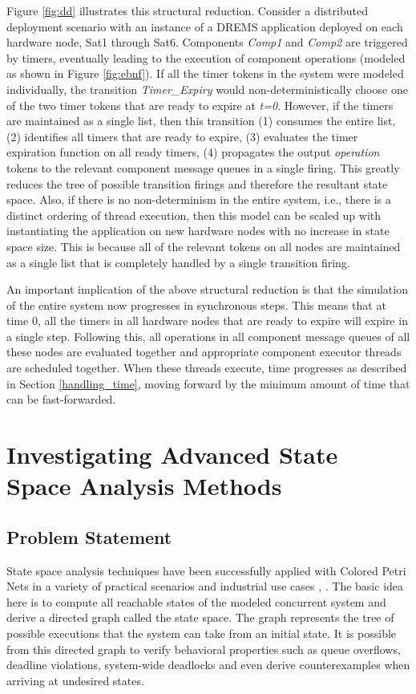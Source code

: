 Figure \ref{fig:dd} illustrates this structural reduction. Consider a distributed deployment scenario with an instance of a DREMS application deployed on each hardware node, Sat1 through Sat6. Components \emph{Comp1} and \emph{Comp2} are triggered by timers, eventually leading to the execution of component operations (modeled as shown in Figure \ref{fig:ebnf}). If all the timer tokens in the system were modeled individually, the transition \emph{Timer\_Expiry} would non-deterministically choose one of the two timer tokens that are ready to expire at \emph{t=0}. However, if the timers are maintained as a single list, then this transition (1) consumes the entire list, (2) identifies all timers that are ready to expire, (3) evaluates the timer expiration function on all ready timers, (4) propagates the output \emph{operation} tokens to the relevant component message queues in a single firing. This greatly reduces the tree of possible transition firings and therefore the resultant state space. Also, if there is no non-determinism in the entire system, i.e., there is a distinct ordering of thread execution, then this model can be scaled up with instantiating the application on new hardware nodes with no increase in state space size. This is because all of the relevant tokens on all nodes are maintained as a single list that is completely handled by a single transition firing. 

An important implication of the above structural reduction is that the simulation of the entire system now progresses in synchronous steps. This means that at time 0, all the timers in all hardware nodes that are ready to expire will expire in a single step. Following this, all operations in all component message queues of all these nodes are evaluated together and appropriate component executor threads are scheduled together. When these threads execute, time progresses as described in Section \ref{handling_time}, moving forward by the minimum amount of time that can be fast-forwarded.

\newpage
\section{Investigating Advanced State Space Analysis Methods}

\subsection{Problem Statement}
State space analysis techniques have been successfully applied with Colored Petri Nets in a variety of practical scenarios and industrial use cases \cite{CPN_0}, \cite{CPN_1}. The basic idea here is to compute all reachable states of the modeled concurrent system and derive a directed graph called the state space. The graph represents the tree of possible executions that the system can take from an initial state. It is possible from this directed graph to verify behavioral properties such as queue overflows, deadline violations, system-wide deadlocks and even derive counterexamples when arriving at undesired states. 

